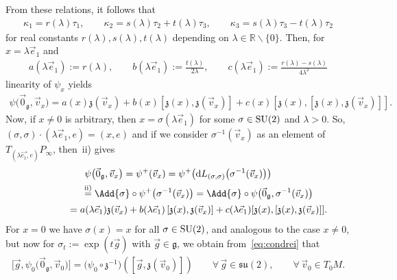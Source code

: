\documentclass[pdftex]{sigma}
\numberwithin{equation}{section}
\begin{document}
From these relations, it follows that
\begin{gather*}
\kappa_1=r(\lambda)\tau_1,
\qquad
\kappa_2=s(\lambda)\tau_2+ t(\lambda)\tau_3,
\qquad
\kappa_3=s(\lambda)\tau_3- t(\lambda)\tau_2
\end{gather*}
for real constants $r(\lambda),s(\lambda),t(\lambda)$ depending on $\lambda\in\mathbb{R}\backslash\{0\}$.
Then, for $x=\lambda \vec{e}_1$ and
\begin{gather*}
a(\lambda\vec{e}_1):=r(\lambda),
\qquad
b(\lambda \vec{e}_1):=\frac{t(\lambda)}{2\lambda},
\qquad
c(\lambda\vec{e}_1):=\frac{r(\lambda)-s(\lambda)}{4\lambda^2}
\end{gather*}
linearity of $\psi_x$ yields
\begin{gather*}
\psi\big(\vec{0}_{\mathfrak{g}},\vec{v}_x\big)=a(x) {\mathfrak{z}}(\vec{v}_x)+
b(x)[{\mathfrak{z}}(x),{\mathfrak{z}}(\vec{v}_x)]+c(x)[{\mathfrak{z}}(x),[{\mathfrak{z}}(x),{\mathfrak{z}}(\vec{v}_x)]].
\end{gather*}
Now, if $x\neq 0$ is arbitrary, then $x=\sigma(\lambda\vec{e}_1)$ for some $\sigma\in {\rm SU}(2)$ and $\lambda > 0$.
So, $(\sigma,\sigma)\cdot (\lambda \vec{e}_1,e)=(x,e)$ and if we consider $\sigma^{-1}(\vec{v}_x)$ as an element of
$T_{(\lambda\vec{e_1},e)}P_\infty$, then~ii) gives
\begin{gather*}
\psi\big(\vec{0}_{\mathfrak{g}},\vec{v}_x\big)
=\psi^+(\vec{v}_x) =\psi^+\big(\mathrm{d}L_{(\sigma,\sigma)}\big(\sigma^{-1}(\vec{v}_x)\big)\big)
\\
\phantom{\psi\big(\vec{0}_{\mathfrak{g}},\vec{v}_x\big)}
\stackrel{\rm ii)}{=}\Add{\sigma}\circ
\psi^+\big(\sigma^{-1}(\vec{v}_x)\big)=\Add{\sigma}\circ \psi\big(\vec{0}_{\mathfrak{g}},\sigma^{-1}(\vec{v}_x)\big)
\\
\phantom{\psi\big(\vec{0}_{\mathfrak{g}},\vec{v}_x\big)}
=a(\lambda\vec{e}_1){\mathfrak{z}}(\vec{v}_x)+b(\lambda\vec{e}_1)\left[{\mathfrak{z}}(x),{\mathfrak{z}}(\vec{v}_x)\right]+c(\lambda\vec{e}_1)
[{\mathfrak{z}}(x),[{\mathfrak{z}}(x),{\mathfrak{z}}(\vec{v}_x)]].
\end{gather*}
\noindent For $x=0$ we have $\sigma(x)=x$ for all $\sigma\in {\rm SU}(2)$, and analogous to the case $x\neq 0$, but now for
$\sigma_t:=\exp(t\vec{g})$ with $\vec{g}\in \mathfrak{g}$, we obtain from~\eqref{eq:condrei} that
\begin{gather*}
\big[\vec{g},\psi_0\big(\vec{0}_{\mathfrak{g}},\vec{v}_0\big)\big]=\big(\psi_0\circ
{\mathfrak{z}}^{-1}\big)\left([\vec{g},{\mathfrak{z}}(\vec{v}_0)]\right)
\qquad\forall\, \vec{g}\in\mathfrak{su}(2), \qquad\forall\, \vec{v}_0\in T_0M.
\end{gather*}
\end{document}
